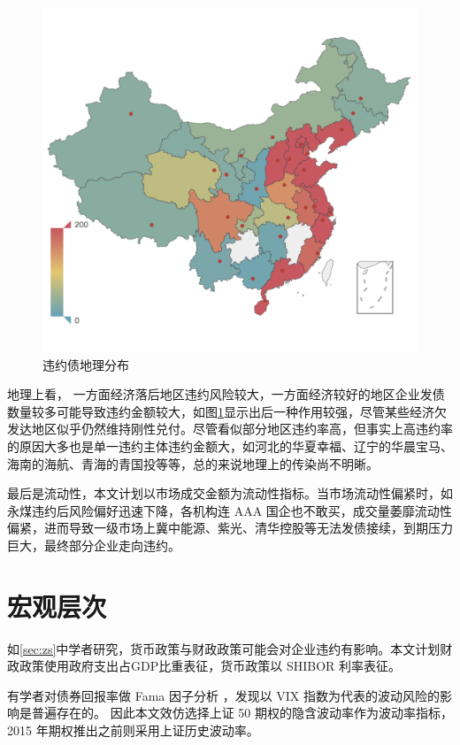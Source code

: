 \begin{figure}[h]
	\centering
	\includegraphics[width=.9\linewidth]{./data/default_by_geo.png}
	\caption{\label{fig:geo}违约债地理分布}
\end{figure}
地理上看，
一方面经济落后地区违约风险较大，一方面经济较好的地区企业发债数量较多可能导致违约金额较大，如图\ref{fig:geo}显示出后一种作用较强，尽管某些经济欠发达地区似乎仍然维持刚性兑付。尽管看似部分地区违约率高，但事实上高违约率的原因大多也是单一违约主体违约金额大，如河北的华夏幸福、辽宁的华晨宝马、海南的海航、青海的青国投等等，总的来说地理上的传染尚不明晰。

最后是流动性，本文计划以市场成交金额为流动性指标。当市场流动性偏紧时，如永煤违约后风险偏好迅速下降，各机构连 AAA 国企也不敢买，成交量萎靡流动性偏紧，进而导致一级市场上冀中能源、紫光、清华控股等无法发债接续，到期压力巨大，最终部分企业走向违约。
\section{宏观层次}
如\ref{sec:zs}中学者研究，货币政策与财政政策可能会对企业违约有影响。本文计划财政政策使用政府支出占GDP比重表征，货币政策以 SHIBOR 利率表征。

有学者对债券回报率做 Fama 因子分析
\cite{chung2019volatility}
，发现以 VIX 指数为代表的波动风险的影响是普遍存在的。
因此本文效仿选择上证 50 期权的隐含波动率作为波动率指标，2015 年期权推出之前则采用上证历史波动率。
